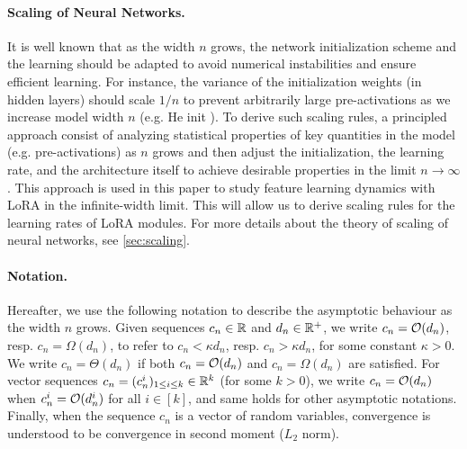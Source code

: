 \paragraph{Scaling of Neural Networks.}
It is well known that as the width $n$ grows, the network initialization scheme and the learning should be adapted to avoid numerical instabilities and ensure efficient learning. For instance, the variance of the initialization weights (in hidden layers) should scale $1/n$ to prevent arbitrarily large pre-activations as we increase model width $n$ (e.g. He init \cite{he2016deep}). To derive such scaling rules, a principled approach consist of analyzing statistical properties of key quantities in the model (e.g. pre-activations) as $n$ grows and then adjust the initialization, the learning rate, and the architecture itself to achieve desirable properties in the limit $n \to \infty$ \citep{hayou19activation, deepinfoprop2017, yang2019scaling, yang2023tensor}. This approach is used in this paper to study feature learning dynamics with LoRA in the infinite-width limit. This will allow us to derive scaling rules for the learning rates of LoRA modules. For more details about the theory of scaling of neural networks, see \cref{sec:scaling}.
\vspace{-1em}
\paragraph{Notation.} Hereafter, we use the following notation to describe the asymptotic behaviour as the width $n$ grows. Given sequences $c_n \in \mathbb{R}$ and $d_n \in \mathbb{R}^+$, we write $c_n = \mathcal{O}(d_n)$, resp. $c_n = \Omega(d_n)$, to refer to $c_n < \kappa d_n$, resp. $c_n > \kappa d_n$, for some constant $\kappa > 0$. We write $c_n = \Theta(d_n)$ if both $c_n = \mathcal{O}(d_n)$ and $c_n = \Omega(d_n)$ are satisfied. For vector sequences $c_n = (c_n^i)_{1 \leq i \leq k} \in \mathbb{R}^k$ (for some $k >0$), we write $c_n = \mathcal{O}(d_n)$ when $c_n^i = \mathcal{O}(d_n^i)$ for all $i \in [k]$, and same holds for other asymptotic notations. Finally, when the sequence $c_n$ is a vector of random variables, convergence is understood to be convergence in second moment ($L_2$ norm).
